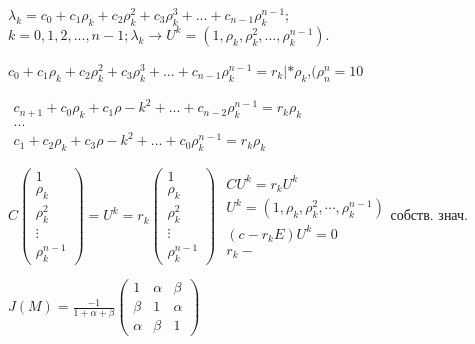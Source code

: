 \vspace{0.2cm}

\(
\lambda_k = c_0 + c_1\rho_k + c_2\rho_k^2 + c_3\rho_k^3 + ... +c_{n-1}\rho_k^{n-1}
\);\hspace{0.1cm}\(k = 0,1,2,...,n-1; 
\lambda_k \longrightarrow U^k = (1,\rho_k,\rho_k^2,...,\rho_k^{n-1}).\)
\newpage
\begin{center}
\(
 c_0 + c_1\rho_k + c_2\rho_k^2 + c_3\rho_k^3 + ... +c_{n-1}\rho_k^{n-1} = r_k  | *\rho_k
 \),\hspace{0.1cm}\((\rho_n^n = 10\)

\vspace{0.5cm}
\(
\begin{matrix}
	c_{n+1}+ c_0\rho_k + c_1\rho-k^2 + ... + c_{n-2}\rho_k^{n-1} = r_k\rho_k\\
	...\\
	c_1+ c_2\rho_k + c_3\rho-k^2 + ... + c_0\rho_k^{n-1} = r_k\rho_k
\end{matrix}
 \)

\end{center}
\vspace{0.5cm}
\(
C
	\begin{pmatrix}
		1\\ \rho_k \\ \rho_k^2 \\ \vdots \\ \rho_k^{n-1}
	\end{pmatrix}
	=U^k = 
	r_k
	\begin{pmatrix}
		1\\ \rho_k \\ \rho_k^2 \\ \vdots \\ \rho_k^{n-1}
	\end{pmatrix}
\)\hspace{1cm}
\(
	\begin{matrix}
		CU^k = r_kU^k \\
		U^k = (1, \rho_k, \rho_k^2, \cdots, \rho_k^{n-1}) \\
		(c - r_kE)U^k = 0\\ 
		r_k - 
	\end{matrix}
\)собств. знач.

\vspace{0.5cm}

\(
J(M) 
=\frac{-1}{1+\alpha+\beta}
	\begin{pmatrix}
		1 & \alpha & \beta\\
		\beta & 1 & \alpha\\
		\alpha & \beta & 1
	\end{pmatrix}
\)


